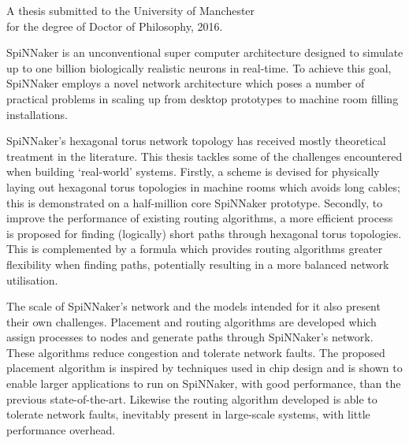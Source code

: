 {
	
	
	
	\vfill
	
	\begin{center}
		\textsc{\large\thesistitle}
		
		\vspace{0.5em}
		
		\thesisauthor
		
		\vspace{0.5em}
		
		A thesis submitted to the University of Manchester\\
		for the degree of Doctor of Philosophy, 2016.
	\end{center}
	
	\vfill
	
	
	SpiNNaker is an unconventional super computer architecture designed to
	simulate up to one billion biologically realistic neurons in real-time. To
	achieve this goal, SpiNNaker employs a novel network architecture which poses
	a number of practical problems in scaling up from desktop prototypes to
	machine room filling installations.
	
	SpiNNaker's hexagonal torus network topology has received mostly theoretical
	treatment in the literature. This thesis tackles some of the challenges
	encountered when building `real-world' systems.  Firstly, a scheme is devised
	for physically laying out hexagonal torus topologies in machine rooms which
	avoids long cables; this is demonstrated on a half-million core SpiNNaker
	prototype.  Secondly, to improve the performance of existing routing
	algorithms, a more efficient process is proposed for finding (logically)
	short paths through hexagonal torus topologies. This is complemented by a
	formula which provides routing algorithms greater flexibility when finding
	paths, potentially resulting in a more balanced network utilisation.
	
	The scale of SpiNNaker's network and the models intended for it also present
	their own challenges. Placement and routing algorithms are developed which
	assign processes to nodes and generate paths through SpiNNaker's network.
	These algorithms reduce congestion and tolerate network faults. The proposed
	placement algorithm is inspired by techniques used in chip design and is
	shown to enable larger applications to run on SpiNNaker, with good
	performance, than the previous state-of-the-art. Likewise the routing
	algorithm developed is able to tolerate network faults, inevitably present in
	large-scale systems, with little performance overhead.
	
	
	\par%
}
